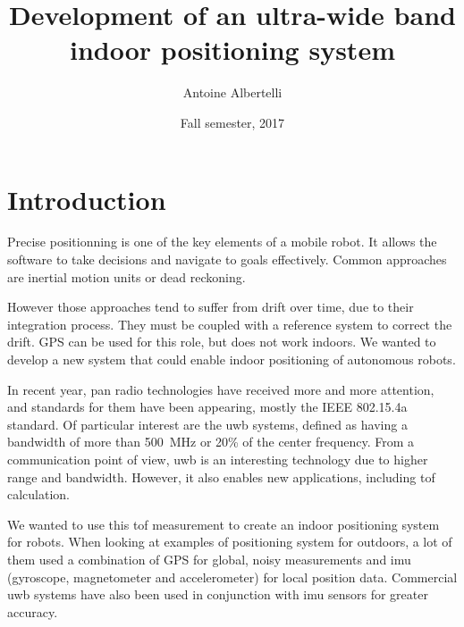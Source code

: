 \documentclass[a4paper, 12pt]{scrreprt}
\title{Development of an ultra-wide band indoor positioning system}
\author{Antoine Albertelli}
\date{Fall semester, 2017}
\begin{document}
\newcommand{\ieeepan}[0]{IEEE 802.15.4a}

\setcounter{tocdepth}{1}


\maketitle


\tableofcontents


\chapter{Introduction}


Precise positionning is one of the key elements of a mobile robot.
It allows the software to take decisions and navigate to goals effectively.
Common approaches are inertial motion units or dead reckoning.

However those approaches tend to suffer from drift over time, due to their integration process.
They must be coupled with a reference system to correct the drift.
GPS can be used for this role, but does not work indoors.
We wanted to develop a new system that could enable indoor positioning of autonomous robots.

In recent year, \gls{pan} radio technologies have received more and more attention\cite{di2006uwb}, and standards for them have been appearing, mostly the \ieeepan{} standard.
Of particular interest are the \gls{uwb} systems, defined as having a bandwidth of more than \SI{500}{\mega\hertz} or 20\% of the center frequency\cite{uwb2006characteristics}.
From a communication point of view, \gls{uwb} is an interesting technology due to higher range and bandwidth.
However, it also enables new applications, including \gls{tof} calculation.

We wanted to use this \gls{tof} measurement to create an indoor positioning system for robots.
When looking at examples of positioning system for outdoors, a lot of them used a combination of GPS for global, noisy measurements and \gls{imu} (gyroscope, magnetometer and accelerometer) for local position data\cite{sporttracking,titterton2004strapdown}.
Commercial \gls{uwb} systems have also been used in conjunction with \gls{imu} sensors for greater accuracy\cite{corrales2008hybrid}.
\end{document}
